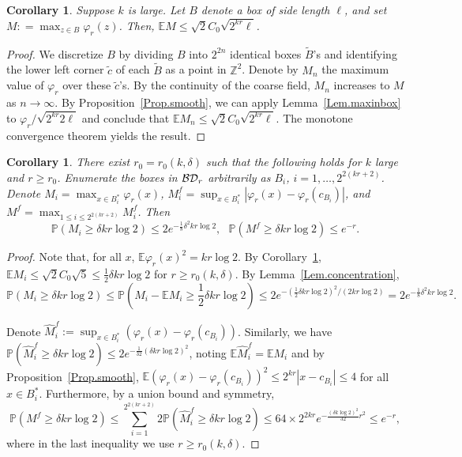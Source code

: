 \documentclass[11pt]{article}
\newtheorem{cor}[theorem]{Corollary}
\theoremstyle{definition}
\def \BD {{\cal BD}}
\def \d {\delta}
\def \E {{\mathbb{E}}}
\def \P {{\mathbb{P}}}
\def \Z {{\mathbb{Z}}}
\begin{document}
 \begin{cor} \label{Cor.maxvalue}
Suppose $k$ is large. Let $B$ denote a box of side length $\ell$, and set $M : = \max_{z \in B} \varphi_r (z)$. Then, $\E M \le \sqrt 2 C_0 \sqrt {2^{kr} \ell }$.
 \end{cor}
 \begin{proof}
We discretize $B$ by dividing $B$ into $2^{2n}$ identical boxes $\tilde B$'s
and identifying the lower left corner $\tilde c$ of each
$\tilde B$ as a point in $\Z^2$.
Denote by $M_n$ the maximum value of $\varphi_r$ over these $\tilde c$'s.
By the continuity of the coarse field,
$M_n$ increases to $M$ as $n \to \infty$.
By Proposition~\ref{Prop.smooth}, we can apply Lemma~\ref{Lem.maxinbox} to $\varphi_r / \sqrt {2^{kr} 2 \ell}$ and conclude that
$\E M_n \le \sqrt 2 C_0 \sqrt {2^{k r} \ell}$. The monotone convergence theorem
yields the result.
 \end{proof}
 \begin{cor} \label{Cor.fluctuation}
There exist $r_0 = r_0 (k, \d)$ such that the following holds for $k$ large and $r \ge r_0$. Enumerate the boxes in $\BD_r$ arbitrarily as $B_i$, $i =1, \ldots, 2^{2(kr+2)}$. Denote $M_i = \max_{x \in B_i^{*}} \varphi_r (x)$, $M_i^f = \sup_{x \in B_i^{*}} |\varphi_r (x) - \varphi_r (c_{B_i})|$, and
$M^f = \max_{1 \le i \le 2^{2 (k r + 2 ) }} M_i^f$. Then
 $$
\P (M_i \ge \d k r \log 2) \le 2 e^{- \frac 1 8 \d^2 k r \log 2}, \ \ \ \P (M^f \ge \d k r \log 2) \le e^{- r}.
 $$
 \end{cor}
 \begin{proof}
Note that, for all $x$,
$\E \varphi_r (x)^2 = k r \log 2$.  By  Corollary~\ref{Cor.maxvalue}, $\E M_i \le \sqrt 2 C_0 \sqrt {5} \le \frac 1 2 \d k r \log 2$ for $r \ge r_0 (k, \d)$. By Lemma~\ref{Lem.concentration},
 $$
\P ( M_i \ge \d k r \log 2) \le \P (M_i - \E M_i \ge \frac 1 2 \d k r \log 2) \le 2 e^{- (\frac 1 2 \d kr \log 2 )^2 / (2 k r \log 2) } = 2 e^{- \frac 1 8 \d^2 k r \log 2} .
 $$

Denote $\hat M_i^f := \sup_{x \in B_i^{*}} (\varphi_r (x) - \varphi_r (c_{B_i}))$. Similarly, we have $\P (\hat M_i^f \ge \d k r \log 2) \le 2 e^{- \frac 1 {32} (\d k r \log 2)^2 }$, noting $\E \hat M^f_i = \E M_i$ and  by Proposition~\ref{Prop.smooth}, $\E (\varphi_r (x) - \varphi_r (c_{B_i} ))^2 \le 2^{k r} |x - c_{B_i}  | \le 4$ for all $x \in B_i^{*}$. Furthermore, by a union bound and symmetry,
 $$
\P (M^f \ge \d k r \log 2) \le \sum_{i=1}^{2^{2 (k r + 2) }} 2 \P (\hat M^f_i \ge \d k r \log 2) \le 64 \times 2^{2 k r}  e^{- \frac {( \d k \log 2 )^2} {32} r^2 } \le e^{- r},
 $$
where in the last inequality we use $r \ge r_0 (k, \d)$.
 \end{proof}
\end{document}
